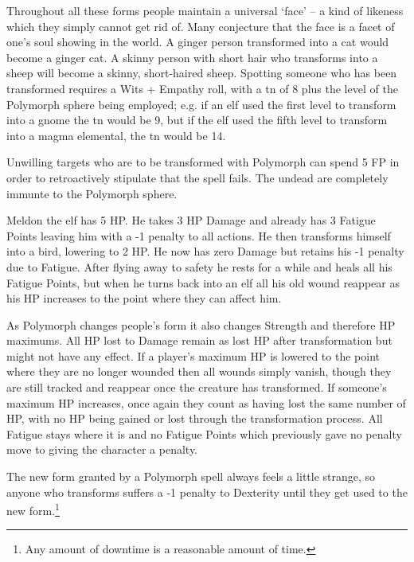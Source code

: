 \begin{multicols}{2}
Throughout all these forms people maintain a universal `face' -- a kind of likeness which they simply cannot get rid of.
Many conjecture that the face is a facet of one's soul showing in the world.
A ginger person transformed into a cat would become a ginger cat.
A skinny person with short hair who transforms into a sheep will become a skinny, short-haired sheep.
Spotting someone who has been transformed requires a Wits + Empathy roll, with a \gls{tn} of 8 plus the level of the Polymorph sphere being employed; e.g. if an elf used the first level to transform into a gnome the \gls{tn} would be 9, but if the elf used the fifth level to transform into a magma elemental, the \gls{tn} would be 14.

Unwilling targets who are to be transformed with Polymorph can spend 5 FP in order to retroactively stipulate that the spell fails.  The undead are completely immunte to the Polymorph sphere.

\begin{exampletext}

	Meldon the elf has 5 HP. He takes 3 HP Damage and already has 3 Fatigue Points leaving him with a -1 penalty to all actions. He then transforms himself into a bird, lowering to 2 HP. He now has zero Damage but retains his -1 penalty due to Fatigue. After flying away to safety he rests for a while and heals all his Fatigue Points, but when he turns back into an elf all his old wound reappear as his HP increases to the point where they can affect him.

\end{exampletext}

As Polymorph changes people's form it also changes Strength and therefore HP maximums.
All HP lost to Damage remain as lost HP after transformation but might not have any effect.
If a player's maximum HP is lowered to the point where they are no longer wounded then all wounds simply vanish, though they are still tracked and reappear once the creature has transformed.
If someone's maximum HP increases, once again they count as having lost the same number of HP, with no HP being gained or lost through the transformation process.
All Fatigue stays where it is and no Fatigue Points which previously gave no penalty move to giving the character a penalty.

The new form granted by a Polymorph spell always feels a little strange, so anyone who transforms suffers a -1 penalty to Dexterity until they get used to the new form.\footnote{Any amount of downtime is a reasonable amount of time.}


\end{multicols}
